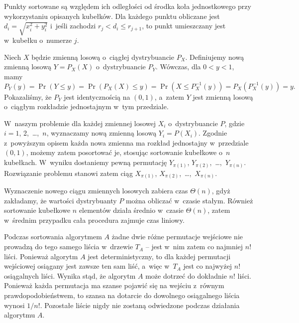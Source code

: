 Punkty sortowane są względem ich odległości od środka koła jednostkowego przy wykorzystaniu opisanych kubełków. Dla każdego punktu obliczane jest $d_i=\sqrt{x_i^2+y_i^2}$ i~jeśli zachodzi $r_j<d_i\le r_{j+1}$, to punkt umieszczany jest w~kubełku o~numerze $j$.

\exercise %
Niech $X$ będzie zmienną losową o~ciągłej dystrybuancie $P_X$. Definiujemy nową zmienną losową $Y=P_X(X)$ o~dystrybuancie $P_Y$. Wówczas, dla $0<y<1$, mamy
\[
    P_Y(y) = \Pr(Y\le y) = \Pr(P_X(X)\le y) = \Pr(X\le P_X^{-1}(y)) = P_X(P_X^{-1}(y)) = y.
\]
Pokazaliśmy, że $P_Y$ jest identycznością na $(0,1)$, a~zatem $Y$ jest zmienną losową o~ciągłym rozkładzie jednostajnym w~tym przedziale.

W~naszym problemie dla każdej zmiennej losowej $X_i$ o~dystrybuancie $P$, gdzie $i=1$, 2,~\dots,~$n$, wyznaczamy nową zmienną losową $Y_i=P(X_i)$. Zgodnie z~powyższym opisem każda nowa zmienna ma rozkład jednostajny w~przedziale $(0,1)$, możemy zatem posortować je, stosując sortowanie kubełkowe o~$n$ kubełkach. W~wyniku dostaniemy pewną permutację $Y_{\pi(1)}$, $Y_{\pi(2)}$,~\dots,~$Y_{\pi(n)}$. Rozwiązanie problemu stanowi zatem ciąg $X_{\pi(1)}$, $X_{\pi(2)}$,~\dots,~$X_{\pi(n)}$.

Wyznaczenie nowego ciągu zmiennych losowych zabiera czas $\Theta(n)$, gdyż zakładamy, że wartości dystrybuanty $P$ można obliczać w~czasie stałym. Również sortowanie kubełkowe $n$ elementów działa średnio w~czasie $\Theta(n)$, zatem w~średnim przypadku cała procedura zajmuje czas liniowy.

\problems


\subproblem %
Podczas sortowania algorytmem $A$ żadne dwie różne permutacje wejściowe nie prowadzą do tego samego liścia w~drzewie $T_A$ -- jest w~nim zatem co najmniej $n!$ liści. Ponieważ algorytm $A$ jest deterministyczny, to dla każdej permutacji wejściowej osiągany jest zawsze ten sam liść, a~więc w~$T_A$ jest co najwyżej $n!$ osiągalnych liści. Wynika stąd, że algorytm $A$ może dotrzeć do dokładnie $n!$ liści. Ponieważ każda permutacja ma szanse pojawić się na wejściu z~równym prawdopodobieństwem, to szansa na dotarcie do dowolnego osiągalnego liścia wynosi $1/n!$. Pozostałe liście nigdy nie zostaną odwiedzone podczas działania algorytmu $A$.

